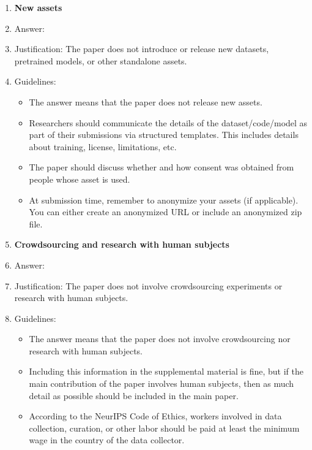 \documentclass{article}
\begin{document}
\begin{enumerate}
\item {\bf New assets}
    \item[] Answer: \answerNA{}
    \item[] Justification: The paper does not introduce or release new datasets, pretrained models, or other standalone assets.
    \item[] Guidelines:
    \begin{itemize}
        \item The answer \answerNA{} means that the paper does not release new assets.
        \item Researchers should communicate the details of the dataset\slash code\slash model as part of their submissions via structured templates. This includes details about training, license, limitations, etc. 
        \item The paper should discuss whether and how consent was obtained from people whose asset is used.
        \item At submission time, remember to anonymize your assets (if applicable). You can either create an anonymized URL or include an anonymized zip file.
    \end{itemize}

\item {\bf Crowdsourcing and research with human subjects}
    \item[] Answer: \answerNA{}
    \item[] Justification: The paper does not involve crowdsourcing experiments or research with human subjects.
    \item[] Guidelines:
    \begin{itemize}
        \item The answer \answerNA{} means that the paper does not involve crowdsourcing nor research with human subjects.
        \item Including this information in the supplemental material is fine, but if the main contribution of the paper involves human subjects, then as much detail as possible should be included in the main paper. 
        \item According to the NeurIPS Code of Ethics, workers involved in data collection, curation, or other labor should be paid at least the minimum wage in the country of the data collector. 
    \end{itemize}


\end{enumerate}
\end{document}
